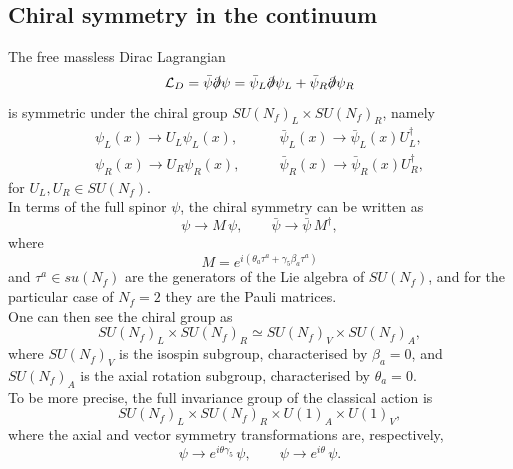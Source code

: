 \subsection{Chiral symmetry in the continuum}

The free massless Dirac Lagrangian
\begin{equation} 
    \mathcal{L}_D = \bar\psi \slashed{\partial} \psi = \bar\psi_L \slashed{\partial} \psi_L + \bar\psi_R \slashed{\partial} \psi_R
\end{equation} 
is symmetric under the chiral group $SU(N_f) _L\times SU(N_f)_R$, namely
\begin{equation*}
	\begin{aligned}
		\psi_L(x) \to U_L\psi_L(x), &\qquad \bar\psi_L(x) \to \bar\psi_L(x) U_L^{\dagger}, \\
		\psi_R(x) \to U_R\psi_R(x), &\qquad \bar\psi_R(x) \to \bar\psi_R(x) U_R^{\dagger},
	\end{aligned}
\end{equation*}
for $U_L, U_R \in SU(N_f)$. \\
In terms of the full spinor $\psi$, the chiral symmetry can be written as 
\begin{equation*} 
    \psi \to M \, \psi, \qquad \bar\psi \to \bar\psi \, M^{\dagger},
\end{equation*} 
where
\begin{equation*}
    M = e^{i(\theta_a \tau^a + \gamma_5 \beta_a\tau^a)}
\end{equation*}
and $\tau^a \in su(N_f)$ are the generators of the Lie algebra of $SU(N_f)$, and for the particular case of $N_f=2$ they are the Pauli matrices. \\
One can then see the chiral group as
\begin{equation*} 
    SU(N_f) _L\times SU(N_f)_R \simeq SU(N_f)_V \times SU(N_f)_A,
\end{equation*}
where $SU(N_f)_V$ is the isospin subgroup, characterised by $\beta_a =0$, and $SU(N_f)_A$ is the axial rotation subgroup, characterised by $\theta_a = 0$. \\
To be more precise, the full invariance group of the classical action is
\begin{equation*}
    SU(N_f)_L \times SU(N_f)_R \times U(1)_A \times U(1)_V,
\end{equation*}
where the axial and vector symmetry transformations are, respectively,
\begin{equation*}
        \psi \to e^{i\theta \gamma_5} \, \psi, \qquad \psi \to e^{i\theta} \, \psi.
\end{equation*} 
